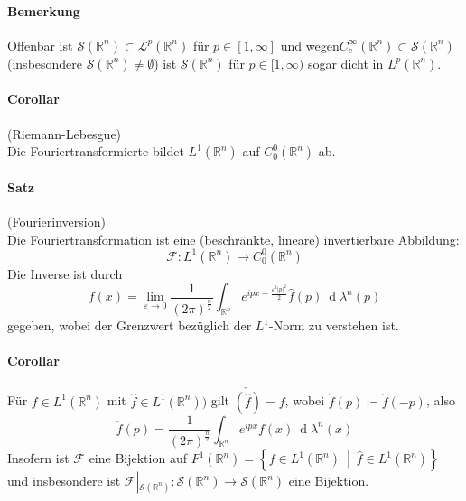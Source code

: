 \documentclass[12pt,a4paper,fleqn]{article}
\def\abs#1{{\left\vert #1 \right\vert}}
\def\set#1{{\left\{ #1 \right\}}}
\def\Mid{\ \middle|\ }
\def\R{{\mathbb{R}}}
\def\d{{\operatorname{d}}}
\begin{document}
\paragraph{Bemerkung} Offenbar ist $\mathscr{S}(\mathbb{R}^n) \subset \mathscr{L}^p(\mathbb{R}^n)$ für $p \in [1, \infty]$ und wegen\linebreak \mbox{$C^\infty_c(\mathbb{R}^n) \subset \mathscr{S}(\R^n)$} (insbesondere $\mathscr{S}(\R^n) \not = \emptyset$) ist $\mathscr{S}(\R^n)$ für $p \in [1, \infty)$ sogar dicht in $L^p(\R^n)$.

\paragraph{Corollar} (Riemann-Lebesgue)\\
Die Fouriertransformierte bildet $L^1(\R^n)$ auf $C^0_0(\R^n)$ ab.

\paragraph{Satz} (Fourierinversion)\\
Die Fouriertransformation ist eine (beschränkte, lineare) invertierbare Abbildung:
\begin{displaymath}
\mathscr{F}: L^1(\R^n) \rightarrow C^0_0(\R^n)
\end{displaymath}
Die Inverse ist durch
\begin{displaymath}
f(x) = \lim_{\varepsilon\rightarrow 0} \frac{1}{(2\pi)^\frac{n}{2}} \int_{\R^n} e^{ipx-\frac{\varepsilon^2\abs{p}^2}{2}}\widehat{f}(p)\ \d\lambda^n(p)
\end{displaymath}
gegeben, wobei der Grenzwert bezüglich der $L^1$-Norm zu verstehen ist.

\paragraph{Corollar}  Für $f \in L^1(\R^n)$ mit $\widehat{f} \in L^1(\R^n))$ gilt $\check{(\widehat{f})} = f$, wobei $\check{f}(p) \coloneqq \widehat{f}(-p)$, also 
\begin{displaymath}
\check{f}(p) = \frac{1}{(2\pi)^{\frac{n}{2}}} \int_{\R^n} e^{ipx}f(x)\ \d\lambda^n(x)
\end{displaymath}
Insofern ist $\mathscr{F}$ eine Bijektion auf $F^1(\R^n) = \set{f \in L^1(\R^n) \Mid \widehat{f} \in L^1(\R^n)}$ und insbesondere ist $\mathscr{F}\left\vert_{\mathscr{S}(\R^n)}\right. \colon \mathscr{S}(\R^n) \rightarrow \mathscr{S}(\R^n)$ eine Bijektion.
\end{document}

